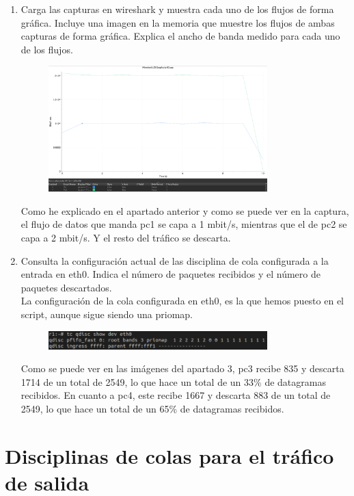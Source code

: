 \documentclass[12pt, a4paper]{report}
\begin{document}
\begin{enumerate}
\begin{figure}[H]
	\end{figure}
 	\item Carga las capturas en wireshark y muestra cada uno de los flujos de forma gráfica. Incluye una
	imagen en la memoria que muestre los flujos de ambas capturas de forma gráfica. Explica el
	ancho de banda medido para cada uno de los flujos.
	\begin{figure}[H]
		\centering
		\includegraphics[width=0.8\textwidth]{ej1.2_4}
	\end{figure}
	Como he explicado en el apartado anterior y como se puede ver en la captura, el flujo de datos que manda pc1 se capa a 1 mbit/s, mientras que el de pc2 se capa a 2 mbit/s. Y el resto del tráfico se descarta. 
	\item Consulta la configuración actual de las disciplina de cola configurada a la entrada en eth0. Indica
	el número de paquetes recibidos y el número de paquetes descartados.\\
	
	La configuración de la cola configurada en eth0, es la que hemos puesto en el script, aunque sigue siendo una priomap.
	\begin{figure}[H]
		\centering
		\includegraphics[width=0.8\textwidth]{ej1.2_5}
	\end{figure}
	Como se puede ver en las imágenes del apartado 3, pc3 recibe 835 y descarta 1714 de un total de 2549, lo que hace un total de un 33\% de datagramas recibidos. En cuanto a pc4, este recibe 1667 y descarta 883 de un total de 2549, lo que hace un total de un 65\% de datagramas recibidos. 
\end{enumerate}
\section{Disciplinas de colas para el tráfico de salida}
\end{document}
